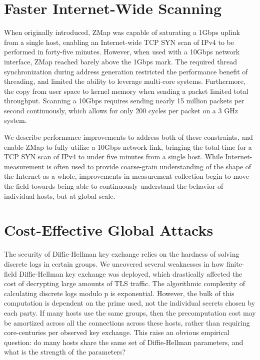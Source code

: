 \section{Faster Internet-Wide Scanning}

When originally introduced, ZMap was capable of saturating a 1Gbps uplink from
a single host, enabling an Internet-wide TCP SYN scan of IPv4 to be performed
in forty-five minutes. However, when used with a 10Gbps network interface, ZMap
reached barely above the 1Gbps mark. The required thread synchronization during
address generation restricted the performance benefit of threading, and limited
the ability to leverage multi-core systems. Furthermore, the copy from user
space to kernel memory when sending a packet limited total throughput. Scanning
a 10Gbps requires sending nearly 15 million packets per second continuously,
which allows for only 200 cycles per packet on a 3 GHz system.

We describe performance improvements to address both of these constraints, and
enable ZMap to fully utilize a 10Gbps network link, bringing the total time for
a TCP SYN scan of IPv4 to under five minutes from a single host. While
Internet-measurement is often used to provide coarse-grain understanding of the
shape of the Internet as a whole, improvements in measurement-collection begin
to move the field towards being able to continuously understand the behavior of
individual hosts, but at global scale.

\section{Cost-Effective Global Attacks}

The security of Diffie-Hellman key exchange relies on the hardness of solving
discrete logs in certain groups. We uncovered several weaknesses in how
finite-field Diffie-Hellman key exchange was deployed, which drastically
affected the cost of decrypting large amounts of TLS traffic. The algorithmic
complexity of calculating discrete logs modulo p is exponential. However, the
bulk of this computation is dependent on the prime used, not the individual
secrets chosen by each party. If many hosts use the same groups, then the
precomputation cost may be amortized across all the connections across these
hosts, rather than requiring core-centuries per observed key exchange. This
raise an obvious empirical question: do many hosts share the same set of
Diffie-Hellman parameters, and what is the strength of the parameters?

